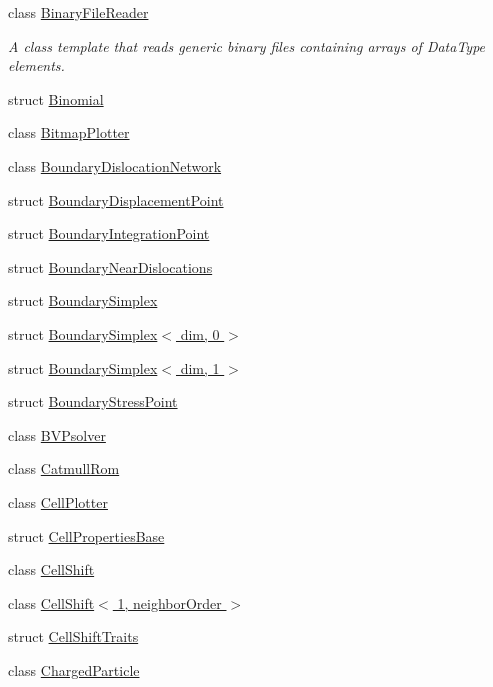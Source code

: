 \begin{DoxyCompactItemize}
\item 
class \hyperlink{classmodel_1_1_binary_file_reader}{Binary\+File\+Reader}
\begin{DoxyCompactList}\small\item\em A class template that reads generic binary files containing arrays of Data\+Type elements. \end{DoxyCompactList}\item 
struct \hyperlink{structmodel_1_1_binomial}{Binomial}
\item 
class \hyperlink{classmodel_1_1_bitmap_plotter}{Bitmap\+Plotter}
\item 
class \hyperlink{classmodel_1_1_boundary_dislocation_network}{Boundary\+Dislocation\+Network}
\item 
struct \hyperlink{structmodel_1_1_boundary_displacement_point}{Boundary\+Displacement\+Point}
\item 
struct \hyperlink{structmodel_1_1_boundary_integration_point}{Boundary\+Integration\+Point}
\item 
struct \hyperlink{structmodel_1_1_boundary_near_dislocations}{Boundary\+Near\+Dislocations}
\item 
struct \hyperlink{structmodel_1_1_boundary_simplex}{Boundary\+Simplex}
\item 
struct \hyperlink{structmodel_1_1_boundary_simplex_3_01dim_00_010_01_4}{Boundary\+Simplex$<$ dim, 0 $>$}
\item 
struct \hyperlink{structmodel_1_1_boundary_simplex_3_01dim_00_011_01_4}{Boundary\+Simplex$<$ dim, 1 $>$}
\item 
struct \hyperlink{structmodel_1_1_boundary_stress_point}{Boundary\+Stress\+Point}
\item 
class \hyperlink{classmodel_1_1_b_v_psolver}{B\+V\+Psolver}
\item 
class \hyperlink{classmodel_1_1_catmull_rom}{Catmull\+Rom}
\item 
class \hyperlink{classmodel_1_1_cell_plotter}{Cell\+Plotter}
\item 
struct \hyperlink{structmodel_1_1_cell_properties_base}{Cell\+Properties\+Base}
\item 
class \hyperlink{classmodel_1_1_cell_shift}{Cell\+Shift}
\item 
class \hyperlink{classmodel_1_1_cell_shift_3_011_00_01neighbor_order_01_4}{Cell\+Shift$<$ 1, neighbor\+Order $>$}
\item 
struct \hyperlink{structmodel_1_1_cell_shift_traits}{Cell\+Shift\+Traits}
\item 
class \hyperlink{classmodel_1_1_charged_particle}{Charged\+Particle}

\end{DoxyCompactItemize}
